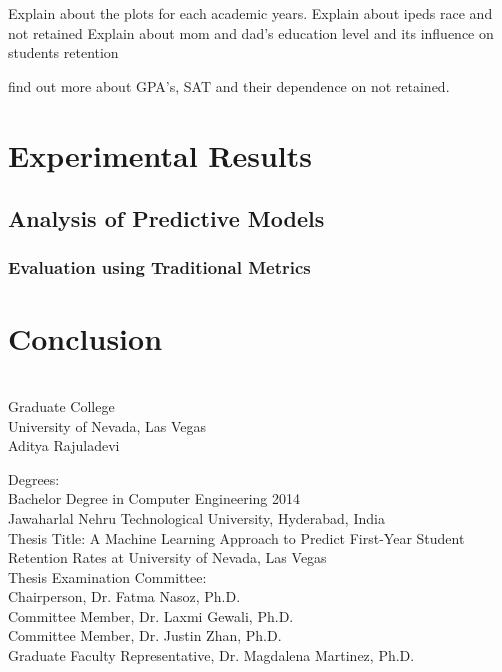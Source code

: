 \documentclass[11pt,openright]{report}
\begin{document}
Explain about the plots for each academic years.
Explain about ipeds race and not retained
Explain about mom and dad's education level and its influence on students retention

find out more about GPA's, SAT and their dependence on not retained.

\chapter{Experimental Results} \label{chapter:experiment_results}
\section {Analysis of Predictive Models}
\subsection {Evaluation using Traditional Metrics}
\chapter{Conclusion} \label{chapter:conclusion}



\vita
\chapter{} %
\linespread{1.3} 
\begin{center}
Graduate College\\
University of Nevada, Las Vegas\\[1cm]
Aditya Rajuladevi\\[1cm]
\end{center}

\noindent Degrees:\\
\indent Bachelor Degree in Computer Engineering 2014\\
\indent Jawaharlal Nehru Technological University, Hyderabad, India\\

\noindent Thesis Title: A Machine Learning Approach to Predict First-Year Student Retention Rates at University of Nevada, Las Vegas\\

\noindent Thesis Examination Committee:\\
\indent Chairperson, Dr. Fatma Nasoz, Ph.D.\\
\indent Committee Member, Dr. Laxmi Gewali, Ph.D.\\
\indent Committee Member, Dr. Justin Zhan, Ph.D.\\
\indent Graduate Faculty Representative, Dr. Magdalena Martinez, Ph.D.\\
\end{document}
